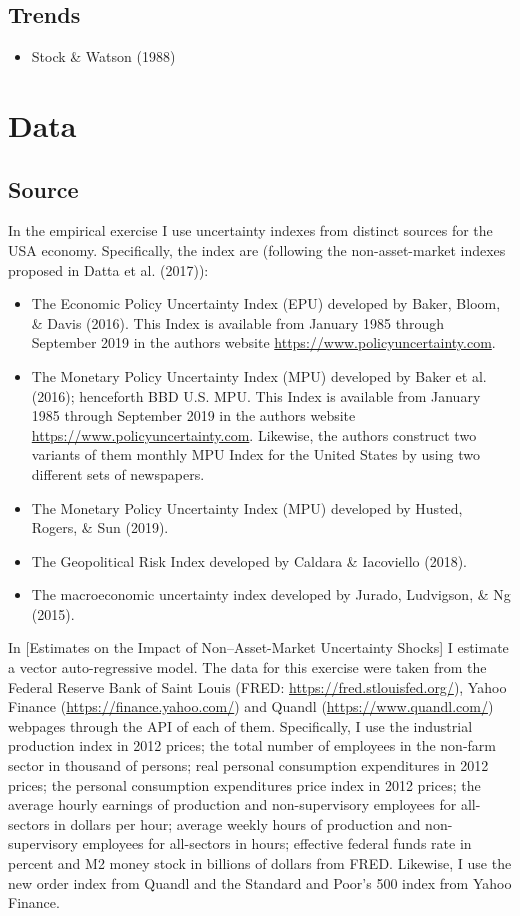 \documentclass[12pt,twoside]{reedthesis}
\providecommand{\tightlist}{%
  \setlength{\itemsep}{0pt}\setlength{\parskip}{0pt}}
\begin{document}
\hypertarget{trends}{%
\section{Trends}\label{trends}}
\begin{itemize}
\tightlist
\item
  Stock \& Watson (1988)
\end{itemize}
\hypertarget{data}{%
\chapter{Data}\label{data}}

\hypertarget{source}{%
\section{Source}\label{source}}

In the empirical exercise I use uncertainty indexes from distinct sources for the USA economy. Specifically, the index are (following the non-asset-market indexes proposed in Datta et al. (2017)):
\begin{itemize}
\tightlist
\item
  The Economic Policy Uncertainty Index (EPU) developed by Baker, Bloom, \& Davis (2016). This Index is available from January 1985 through September 2019 in the authors website \url{https://www.policyuncertainty.com}.
\item
  The Monetary Policy Uncertainty Index (MPU) developed by Baker et al. (2016); henceforth BBD U.S. MPU. This Index is available from January 1985 through September 2019 in the authors website \url{https://www.policyuncertainty.com}. Likewise, the authors construct two variants of them monthly MPU Index for the United States by using two different sets of newspapers.
\item
  The Monetary Policy Uncertainty Index (MPU) developed by Husted, Rogers, \& Sun (2019).
\item
  The Geopolitical Risk Index developed by Caldara \& Iacoviello (2018).
\item
  The macroeconomic uncertainty index developed by Jurado, Ludvigson, \& Ng (2015).
\end{itemize}
In {[}Estimates on the Impact of Non--Asset-Market Uncertainty Shocks{]} I estimate a vector auto-regressive model. The data for this exercise were taken from the Federal Reserve Bank of Saint Louis (FRED: \url{https://fred.stlouisfed.org/}), Yahoo Finance (\url{https://finance.yahoo.com/}) and Quandl (\url{https://www.quandl.com/}) webpages through the API of each of them. Specifically, I use the industrial production index in 2012 prices; the total number of employees in the non-farm sector in thousand of persons; real personal consumption expenditures in 2012 prices; the personal consumption expenditures price index in 2012 prices; the average hourly earnings of production and non-supervisory employees for all-sectors in dollars per hour; average weekly hours of production and non-supervisory employees for all-sectors in hours; effective federal funds rate in percent and M2 money stock in billions of dollars from FRED. Likewise, I use the new order index from Quandl and the Standard and Poor's 500 index from Yahoo Finance.
\end{document}
